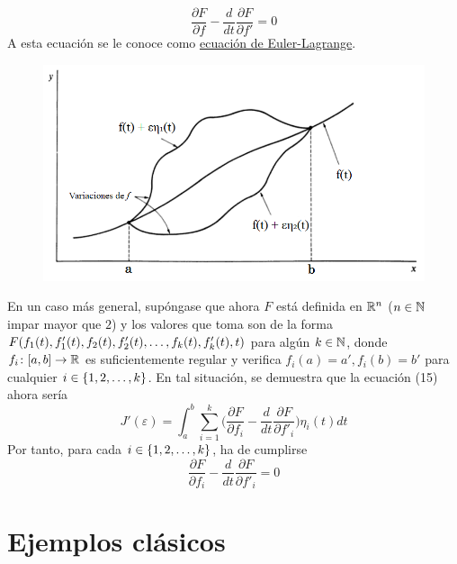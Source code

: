 \documentclass[12pt]{report}
\begin{document}
\setlength\fboxsep{0.3cm}
\setlength\fboxrule{1.5pt}
\[\boxed{\frac{\partial F}{\partial f}-\frac{d}{dt} \frac{\partial F}{\partial f'} = 0}\]
A esta ecuación se le conoce como \ul{ecuación de Euler-Lagrange}.

\begin{figure}[h]
\includegraphics[scale = 0.5]{1.1_1}
\centering
\end{figure}

\vspace{2mm}
En un caso más general, supóngase que ahora $F$ está definida en $\mathbb R^n$ ($n \in \mathbb N$ impar mayor que $2$) y los valores que toma son de la forma $F(f_1(t),f'_1(t),f_2(t),f'_2(t),\mathellipsis,f_k(t),f'_k(t),t)$ para algún $k \in \mathbb N$, donde $f_i \colon [a,b] \to \mathbb R$ es suficientemente regular y verifica $f_i(a) = a', f_i(b) = b'$ para cualquier $i \in \{1,2,\mathellipsis,k\}$. En tal situación, se demuestra que la ecuación (15) ahora sería
\[J'(\varepsilon) = \int_a^b \sum_{i=1}^k \biggl( \frac{\partial F}{\partial f_i}-\frac{d}{dt} \frac{\partial F}{\partial f'_i} \biggr)\eta_i(t)dt \tag{16}\]
Por tanto, para cada $i \in \{1,2,\mathellipsis,k\}$, ha de cumplirse
\[\boxed{\frac{\partial F}{\partial f_i}-\frac{d}{dt} \frac{\partial F}{\partial f'_i} = 0}\]

\section{Ejemplos clásicos}
\end{document}
